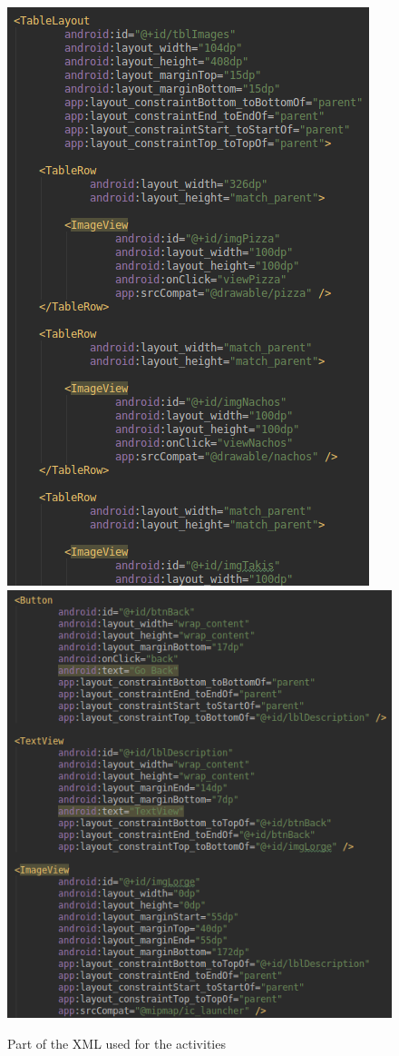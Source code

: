 \documentclass{scrartcl}
\begin{document}
\begin{figure}[h]
    \includegraphics[scale=0.5]{images/screen2.png}
    \includegraphics[scale=0.5]{images/screen3.png}
    \caption{Part of the XML used for the activities}
\end{figure}
\end{document}
